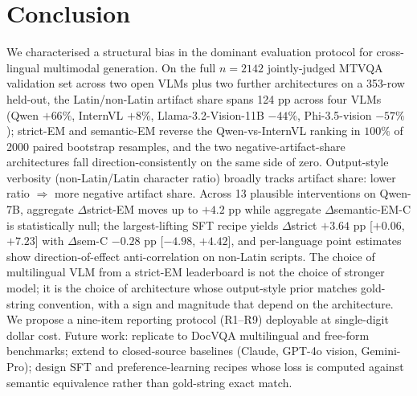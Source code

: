 \section{Conclusion}
\label{sec:conclusion}

We characterised a structural bias in the dominant evaluation protocol for cross-lingual multimodal generation. On the full $n=2142$ jointly-judged MTVQA validation set across two open VLMs plus two further architectures on a 353-row held-out, the Latin/non-Latin artifact share spans 124 pp across four VLMs (Qwen $+66\%$, InternVL $+8\%$, Llama-3.2-Vision-11B $-44\%$, Phi-3.5-vision $-57\%$); strict-EM and semantic-EM reverse the Qwen-vs-InternVL ranking in $100\%$ of 2000 paired bootstrap resamples, and the two negative-artifact-share architectures fall direction-consistently on the same side of zero. Output-style verbosity (non-Latin/Latin character ratio) broadly tracks artifact share: lower ratio $\Rightarrow$ more negative artifact share. Across 13 plausible interventions on Qwen-7B, aggregate $\Delta$strict-EM moves up to $+4.2$ pp while aggregate $\Delta$semantic-EM-C is statistically null; the largest-lifting SFT recipe yields $\Delta$strict $+3.64$ pp [$+0.06$, $+7.23$] with $\Delta$sem-C $-0.28$ pp [$-4.98$, $+4.42$], and per-language point estimates show direction-of-effect anti-correlation on non-Latin scripts. The choice of multilingual VLM from a strict-EM leaderboard is not the choice of stronger model; it is the choice of architecture whose output-style prior matches gold-string convention, with a sign and magnitude that depend on the architecture. We propose a nine-item reporting protocol (R1--R9) deployable at single-digit dollar cost. Future work: replicate to DocVQA multilingual and free-form benchmarks; extend to closed-source baselines (Claude, GPT-4o vision, Gemini-Pro); design SFT and preference-learning recipes whose loss is computed against semantic equivalence rather than gold-string exact match.
